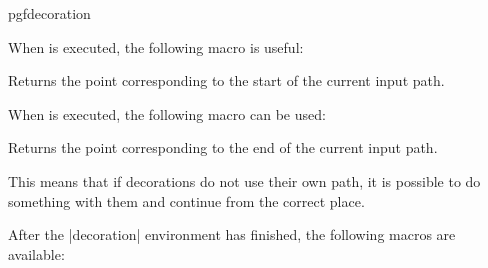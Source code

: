 \begin{environment}{{pgfdecoration}}
\begin{codeexample}[]
\end{codeexample}

  When  is executed, the following macro is useful:
  \begin{command}{\pgfpointdecoratedpathfirst}
    Returns the point corresponding to the start of the current
    input path.
  \end{command}
  When  is executed, the following macro can be used:
  \begin{command}{\pgfpointdecoratedpathlast}
    Returns the point corresponding to the end of the current input
    path.
  \end{command}
  This means that if decorations do not use their own path, it is
  possible to do something with them and continue from the
  correct place.
	
\begin{codeexample}[]
\end{codeexample}
	
  After the |{decoration}| environment has finished, the following
  macros are available:
	

\end{environment}
